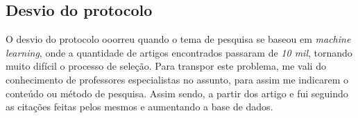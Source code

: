 \documentclass[conference]{IEEEtran}
\begin{document}
\subsection{Desvio do protocolo}
O desvio do protocolo ooorreu quando o tema de pesquisa se baseou em \emph{machine learning}, onde a quantidade de artigos encontrados passaram de \emph{10 mil}, tornando muito difícil o processo de seleção. Para transpor este problema, me vali do conhecimento de professores especialistas no assunto, para assim me indicarem o conteúdo ou método de pesquisa. Assim sendo, a partir dos artigo \cite{Ueffing2007} e \cite{Domingos2012} fui seguindo as citações feitas pelos mesmos e aumentando a base de dados.


\twocolumn
\end{document}
